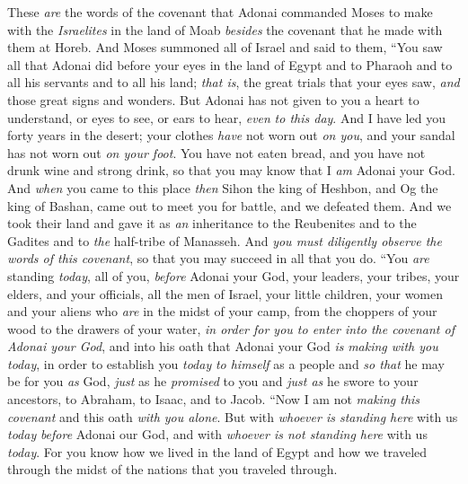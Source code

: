 \begin{biblechapter} %
  These \textit{are} the words of the covenant that Adonai commanded Moses to make with the \textit{Israelites} in the land of Moab \textit{besides} the covenant that he made with them at Horeb.
\verse And Moses summoned all of Israel and said to them, “You saw all that Adonai did before your eyes in the land of Egypt and to Pharaoh and to all his servants and to all his land;
\verse \textit{that is}, the great trials that your eyes saw, \textit{and} those great signs and wonders.
\verse But Adonai has not given to you a heart to understand, or eyes to see, or ears to hear, \textit{even} \textit{to this day}.
\verse And I have led you forty years in the desert; your clothes \textit{have} not worn out \textit{on you}, and your sandal has not worn out \textit{on your foot}.
\verse You have not eaten bread, and you have not drunk wine and strong drink, so that you may know that I \textit{am} Adonai your God.
\verse And \textit{when} you came to this place \textit{then} Sihon the king of Heshbon, and Og the king of Bashan, came out to meet you for battle, and we defeated them.
\verse And we took their land and gave it as \textit{an} inheritance to the Reubenites and to the Gadites and to \textit{the} half-tribe of Manasseh.
\verse And \textit{you must diligently observe the words of this covenant}, so that you may succeed in all that you do.
\verse “You \textit{are} standing \textit{today}, all of you, \textit{before} Adonai your God, your leaders, your tribes, your elders, and your officials, all the men of Israel,
\verse your little children, your women and your aliens who \textit{are} in the midst of your camp, from the choppers of your wood to the drawers of your water,
\verse \textit{in order for you to enter into the covenant of Adonai your God}, and into his oath that Adonai your God \textit{is} \textit{making with you} \textit{today},
\verse in order to establish you \textit{today} \textit{to himself} as a people and \textit{so that} he may be for you \textit{as} God, \textit{just} as he \textit{promised} to you and \textit{just as} he swore to your ancestors, to Abraham, to Isaac, and to Jacob.
\verse “Now I am not \textit{making this covenant} and this oath \textit{with you alone}.
\verse But with \textit{whoever is standing here} with us \textit{today} \textit{before} Adonai our God, and with \textit{whoever is not standing here} with us \textit{today}.
\verse For you know how we lived in the land of Egypt and how we traveled through the midst of the nations that you traveled through.

\end{biblechapter}
